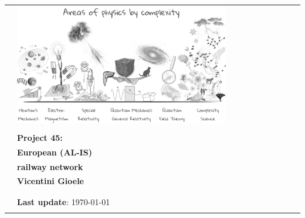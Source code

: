 \begin{center}
\begin{spacing}{1.3}
\begin{tabular}{p{4cm} ll}
&  \includegraphics[width=0.77\textwidth]{images/areas_of_physics.png} \\\\
& \textcolor{unipd}{\textbf{\huge Project 45:}}\\ %
& \textcolor{unipd}{\textbf{\huge European (AL-IS)}}\\ %
& \textcolor{unipd}{\textbf{\huge railway network}}\\ %
& \textbf{Vicentini Gioele}\\
& \\
& \\
& \scriptsize \textbf{Last update}: \today\\\\
\end{tabular}

\end{spacing}

\end{center}



\thispagestyle{empty} %
\clearpage\setcounter{page}{1} %
